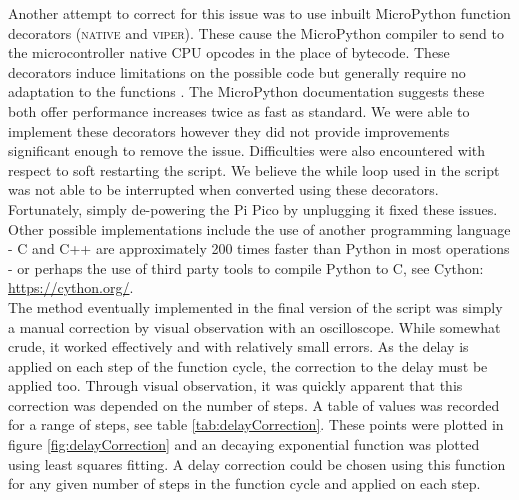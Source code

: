 \documentclass[%
 reprint,
 amsmath,amssymb,
 aps,
]{revtex4-2}
\begin{document}
        Another attempt to correct for this issue was to use inbuilt MicroPython function decorators (\textsc{native} and \textsc{viper}). These cause the MicroPython compiler to send to the microcontroller native CPU opcodes in the place of bytecode. These decorators induce limitations on the possible code but generally require no adaptation to the functions \cite{micropython}. The MicroPython documentation suggests these both offer performance increases twice as fast as standard. We were able to implement these decorators however they did not provide improvements significant enough to remove the issue. Difficulties were also encountered with respect to soft restarting the script. We believe the while loop used in the script was not able to be interrupted when converted using these decorators. Fortunately, simply de-powering the Pi Pico by unplugging it fixed these issues.\\

        Other possible implementations include the use of another programming language - C and C++ are approximately 200 times faster than Python in most operations \cite{ucd} - or perhaps the use of third party tools to compile Python to C, see Cython: \url{https://cython.org/}.\\

        The method eventually implemented in the final version of the script was simply a manual correction by visual observation with an oscilloscope. While somewhat crude, it worked effectively and with relatively small errors. As the delay is applied on each step of the function cycle, the correction to the delay must be applied too. Through visual observation, it was quickly apparent that this correction was depended on the number of steps. A table of values was recorded for a range of steps, see table \ref{tab:delayCorrection}. These points were plotted in figure \ref{fig:delayCorrection} and an decaying exponential function was plotted using least squares fitting. A delay correction could be chosen using this function for any given number of steps in the function cycle and applied on each step.

        \begin{table}[]
        \caption{Table of time delay correction values for function generation using the DAC. $N$ is the number of steps in the function cycle, and $t_c$ is the time correction subtracted from the delay in each step.}
        \label{tab:delayCorrection}
        \end{table}
\end{document}
